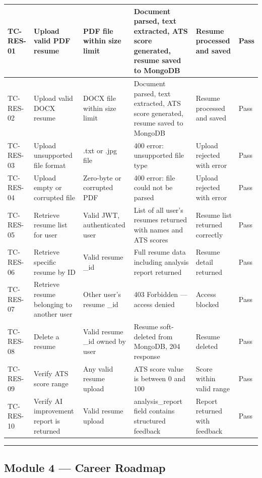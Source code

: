 \documentclass[12pt]{article}
\begin{document}
\begin{longtable}{|p{}|p{}|p{}|p{}|p{}|p{}|}
\hline
\textbf{TC-RES-01} & \textbf{Upload valid PDF resume} & \textbf{PDF file within size limit} & \textbf{Document parsed, text extracted, ATS score generated, resume saved to MongoDB} & \textbf{Resume processed and saved} & \textbf{Pass} \\ \hline
\endhead
TC-RES-02 & Upload valid DOCX resume & DOCX file within size limit & Document parsed, text extracted, ATS score generated, resume saved to MongoDB & Resume processed and saved & Pass \\ \hline
TC-RES-03 & Upload unsupported file format & .txt or .jpg file & 400 error: unsupported file type & Upload rejected with error & Pass \\ \hline
TC-RES-04 & Upload empty or corrupted file & Zero-byte or corrupted PDF & 400 error: file could not be parsed & Upload rejected with error & Pass \\ \hline
TC-RES-05 & Retrieve resume list for user & Valid JWT, authenticated user & List of all user's resumes returned with names and ATS scores & Resume list returned correctly & Pass \\ \hline
TC-RES-06 & Retrieve specific resume by ID & Valid resume \_id & Full resume data including analysis report returned & Resume detail returned & Pass \\ \hline
TC-RES-07 & Retrieve resume belonging to another user & Other user's resume \_id & 403 Forbidden — access denied & Access blocked & Pass \\ \hline
TC-RES-08 & Delete a resume & Valid resume \_id owned by user & Resume soft-deleted from MongoDB, 204 response & Resume deleted & Pass \\ \hline
TC-RES-09 & Verify ATS score range & Any valid resume upload & ATS score value is between 0 and 100 & Score within valid range & Pass \\ \hline
TC-RES-10 & Verify AI improvement report is returned & Valid resume upload & analysis\_report field contains structured feedback & Report returned with feedback & Pass \\ \hline
\end{longtable}



\noindent\rule{\textwidth}{0.4pt}

\subsection{Module 4 — Career Roadmap}
\end{document}
